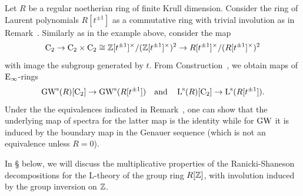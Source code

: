 \begin{example}
\label{example:Gm}%
Let $R$ be a regular noetherian ring of finite Krull dimension. Consider the ring of Laurent polynomials $R[t^{\pm1}]$ as a commutative ring with trivial involution as in Remark~. Similarly as in the example above, consider the map 
\[
\mathrm{C_2} \to \mathrm{C_2} \times \mathrm{C_2} \cong \mathbb{Z}[t^{\pm1}]^\times/(\mathbb{Z}[t^{\pm1}]^\times)^2 \to R[t^{\pm1}]^\times/(R[t^{\pm1}]^\times)^2
\]
with image the subgroup generated by $t$. From Construction~, we obtain maps of ${\mathrm{E}_{\infty}}$-rings 
\[
\operatorname{GW}^{\mathrm{s}}(R)[\mathrm{C_2}] \to \operatorname{GW}^{\mathrm{s}}(R[t^{\pm1}]) \quad \text{and} \quad \operatorname L^{\mathrm{s}}(R)[\mathrm{C_2}] \to \operatorname L^{\mathrm{s}}(R[t^{\pm1}]).
\]
Under the the equivalences indicated in Remark~, one can show that the underlying map of spectra for the latter map is the identity while for $\operatorname{GW}$ it is induced by the boundary map in the Genauer sequence (which is not an equivalence unless $R = 0$).


In \S{} below, we will discuss the multiplicative properties of the Ranicki-Shaneson decompositions for the L-theory of the group ring $R[\mathbb{Z}]$, with involution induced by the group inversion on $\mathbb{Z}$.
\end{example}

